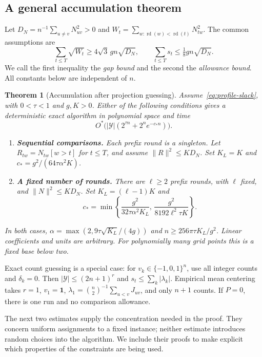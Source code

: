 \documentclass[11pt,a4paper]{article}
\newtheorem{theorem}{Theorem}[section]
\theoremstyle{definition}
\theoremstyle{remark}
\newcommand{\Ostar}{O^{*}}
\newcommand{\ind}{\mathbf 1}
\begin{document}
\subsection{A general accumulation theorem}

Let $D_N=n^{-1}\sum_{u\ne v}N_{uv}^2>0$ and
$W_t=\sum_{w:\operatorname{rd}(w)<\operatorname{rd}(t)}N_{tw}^2$. The common assumptions are
\begin{equation}
 \sum_{t\le T}\sqrt{W_t}\ge4\sqrt3\,g n\sqrt{D_N},\qquad
 \sum_{t\le T}s_t\le\tfrac18g n\sqrt{D_N}.       \label{eq:profile-slack}
\end{equation}
We call the first inequality the \emph{gap bound} and the second the
\emph{allowance bound}. All constants below are independent of $n$.

\begin{theorem}[Accumulation after projection guessing]\label{res:counts}
Assume~\eqref{eq:profile-slack}, with $0<\tau<1$ and $g,K>0$.
Either of the following conditions gives a deterministic exact algorithm
in polynomial space and time
\[
 \Ostar\bigl(|\mathcal Y|(2^{\tau n}+2^ne^{-c_*n})\bigr).
\]
\begin{enumerate}
\item \textbf{Sequential comparisons.} Each prefix round is a singleton.
Let $R_{tw}=N_{tw}[w>t]$ for $t\le T$, and assume $\|R\|^2\le KD_N$.
Set $K_L=K$ and
$c_*=g^2/(64\tau\alpha^2K)$.
\item \textbf{A fixed number of rounds.} There are $\ell\ge2$ prefix
rounds, with $\ell$ fixed, and $\|N\|^2\le KD_N$.
Set $K_L=(\ell-1)K$ and
\[
 c_*=\min\left\{
 \frac{g^2}{32\tau\alpha^2K_L},\,
 \frac{g^2}{8192\ell^2\tau K}\right\}.
\]
\end{enumerate}
In both cases, $\alpha=\max(2,9\tau\sqrt{K_L}/(4g))$ and
$n\ge256\pi\tau K_L/g^2$. Linear coefficients and units are arbitrary.
For polynomially many grid points this is a fixed base below two.
\end{theorem}

Exact count guessing is a special case: for
$v_k\in\{-1,0,1\}^n$, use all integer counts and $\delta_k=0$.
Then $|\mathcal Y|\le(2n+1)^r$ and $s_t\le\sum_k|\lambda_k|$.
Empirical mean centering takes $r=1$, $v_1=\ind$,
$\lambda_1=\binom n2^{-1}\sum_{u<v}J_{uv}$, and only $n+1$ counts.
If $P=0$, there is one run and no comparison allowance.

The next two estimates supply the concentration needed in the proof.
They concern uniform assignments to a fixed instance; neither estimate
introduces random choices into the algorithm. We include their proofs to
make explicit which properties of the constraints are being used.
\end{document}
